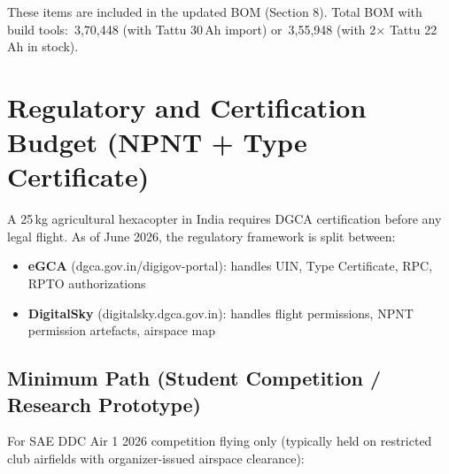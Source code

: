 \documentclass[11pt,a4paper]{article}
\newcommand{\Rs}{\rupee\,}
\begin{document}
\noindent These items are included in the updated BOM (Section 8). Total BOM with build tools: \Rs{}3,70,448 (with Tattu 30\,Ah import) or \Rs{}3,55,948 (with 2$\times$ Tattu 22\,Ah in stock).

\section{Regulatory and Certification Budget (NPNT + Type Certificate)}

A 25\,kg agricultural hexacopter in India requires DGCA certification before any legal flight. As of June 2026, the regulatory framework is split between:

\begin{itemize}
  \item \textbf{eGCA} (dgca.gov.in/digigov-portal): handles UIN, Type Certificate, RPC, RPTO authorizations
  \item \textbf{DigitalSky} (digitalsky.dgca.gov.in): handles flight permissions, NPNT permission artefacts, airspace map
\end{itemize}

\subsection{Minimum Path (Student Competition / Research Prototype)}

For SAE DDC Air 1 2026 competition flying only (typically held on restricted club airfields with organizer-issued airspace clearance):
\end{document}
